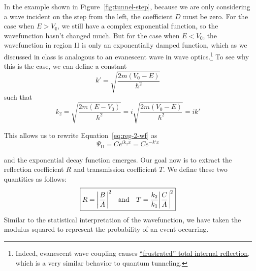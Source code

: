 In the example shown in Figure~\ref{fig:tunnel-step}, because we are only considering a wave incident on the step from the left, the coefficient $D$ must be zero. For the case when $E > V_0$, we still have a complex exponential function, so the wavefunction hasn't changed much. But for the case when $E < V_0$, the wavefunction in region II is only an exponentially damped function, which as we discussed in class is analogous to an evanescent wave in wave optics.\footnote{Indeed, evanescent wave coupling causes \href{https://en.wikipedia.org/wiki/Total_internal_reflection\#Frustrated_total_internal_reflection}{``frustrated'' total internal reflection}, which is a very similar behavior to quantum tunneling.} To see why this is the case, we can define a constant
\begin{equation}
	k' = \sqrt{\frac{2m(V_0-E)}{\hbar^2}} \label{eq:reg-2-kp}
\end{equation}
such that
\begin{equation*}
	k_2 = \sqrt{\frac{2m(E-V_0)}{\hbar^2}} = i\sqrt{\frac{2m(V_0-E)}{\hbar^2}} = ik'
\end{equation*}

This allows us to rewrite Equation~\ref{eq:reg-2-wf} as 
\begin{equation}
	\Psi_{\text{II}} = Ce^{ik_2x} = Ce^{-k'x} \label{eq:reg-2-wfp}
\end{equation}

and the exponential decay function emerges. Our goal now is to extract the reflection coefficient $R$ and transmission coefficient $T$. We define these two quantities as follows:
\begin{equation*}
	\boxed{R = \abs{\frac{B}{A}}^2 \quad \text{and} \quad T = \frac{k_2}{k_1}\abs{\frac{C}{A}}^2}
\end{equation*}
Similar to the statistical interpretation of the wavefunction, we have taken the modulus squared to represent the probability of an event occurring. \par 


